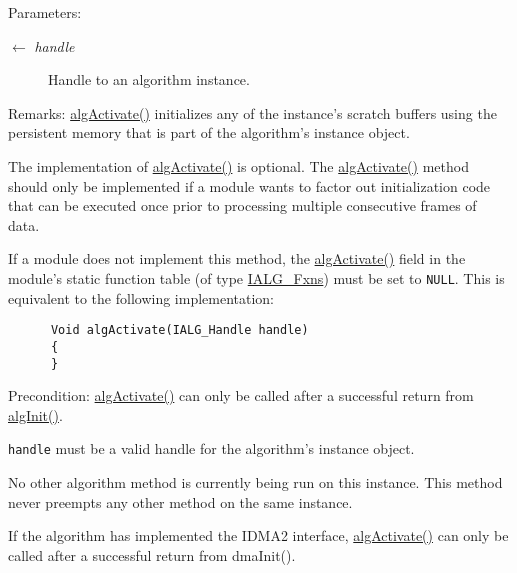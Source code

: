 \begin{Desc}
\item[Parameters:]
\begin{description}
\item[\mbox{$\leftarrow$} {\em handle}]Handle to an algorithm instance.\end{description}
\end{Desc}
\begin{Desc}
\item[Remarks:]\hyperlink{struct_i_a_l_g___fxns_f1213efc8ac6fdfb72b50da9950baaa7}{alg\-Activate()} initializes any of the instance's scratch buffers using the persistent memory that is part of the algorithm's instance object.

The implementation of \hyperlink{struct_i_a_l_g___fxns_f1213efc8ac6fdfb72b50da9950baaa7}{alg\-Activate()} is optional. The \hyperlink{struct_i_a_l_g___fxns_f1213efc8ac6fdfb72b50da9950baaa7}{alg\-Activate()} method should only be implemented if a module wants to factor out initialization code that can be executed once prior to processing multiple consecutive frames of data.

If a module does not implement this method, the \hyperlink{struct_i_a_l_g___fxns_f1213efc8ac6fdfb72b50da9950baaa7}{alg\-Activate()} field in the module's static function table (of type \hyperlink{struct_i_a_l_g___fxns}{IALG\_\-Fxns}) must be set to {\tt NULL}. This is equivalent to the following implementation: 

\begin{Code}\begin{verbatim}      Void algActivate(IALG_Handle handle)
      {
      }
\end{verbatim}\end{Code}

\end{Desc}
\begin{Desc}
\item[Precondition:]\hyperlink{struct_i_a_l_g___fxns_f1213efc8ac6fdfb72b50da9950baaa7}{alg\-Activate()} can only be called after a successful return from \hyperlink{struct_i_a_l_g___fxns_94eca7c58cceb112eccd970a6cf3f569}{alg\-Init()}.

{\tt handle} must be a valid handle for the algorithm's instance object.

No other algorithm method is currently being run on this instance. This method never preempts any other method on the same instance.

If the algorithm has implemented the IDMA2 interface, \hyperlink{struct_i_a_l_g___fxns_f1213efc8ac6fdfb72b50da9950baaa7}{alg\-Activate()} can only be called after a successful return from dma\-Init().\end{Desc}
